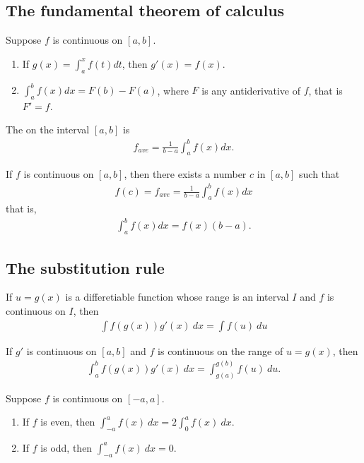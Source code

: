 \documentclass{article}
\begin{document}
\subsection{The fundamental theorem of calculus}
\begin{theorem}
   Suppose $f$ is continuous on $[a,b]$.
   \begin{enumerate}
       \item If $g(x)=\int_a^x f(t)dt$, then $g'(x)=f(x)$.
       \item $\int_a^b f(x)dx=F(b)-F(a)$, where $F$ is any antiderivative of $f$, that is $F'=f$.
   \end{enumerate}
\end{theorem}
\begin{definition}
    The  on the interval $[a,b]$ is
    \begin{align*}
        f_{ave}=\frac{1}{b-a}\int_a^b f(x)dx.
    \end{align*}
\end{definition}
\begin{theorem}
     If $f$ is continuous on $[a,b]$, then there exists a number $c$ in $[a,b]$ such that
    \begin{align*}
        f(c)=f_{ave}=\frac{1}{b-a}\int_a^b f(x)dx
    \end{align*}
    that is,
    \begin{align*}
        \int_a^b f(x)dx=f(x)(b-a).
    \end{align*}
\end{theorem}
\subsection{The substitution rule}
\begin{theorem}
    If $u=g(x)$ is a differetiable function whose range is an interval $I$ and $f$ is continuous on $I$, then
    \begin{align*}
        \int f(g(x))g'(x)\:dx=\int f(u)\:du
    \end{align*}
\end{theorem}
\begin{theorem}
    If $g'$ is continuous on $[a,b]$ and $f$ is continuous on the range of $u=g(x)$, then 
    \begin{align*}
        \int_a^b f(g(x))g'(x)\:dx=\int_{g(a)}^{g(b)}f(u)\:du.
    \end{align*}
\end{theorem}
\begin{theorem}
     Suppose $f$ is continuous on $[-a,a]$.
    \begin{enumerate}
        \item If $f$ is even, then $\int_{-a}^a f(x)\:dx= 2\int_0^a f(x)\:dx$.
        \item If $f$ is odd, then $\int_{-a}^a f(x)\:dx = 0$.
    \end{enumerate}
\end{theorem}
\end{document}
